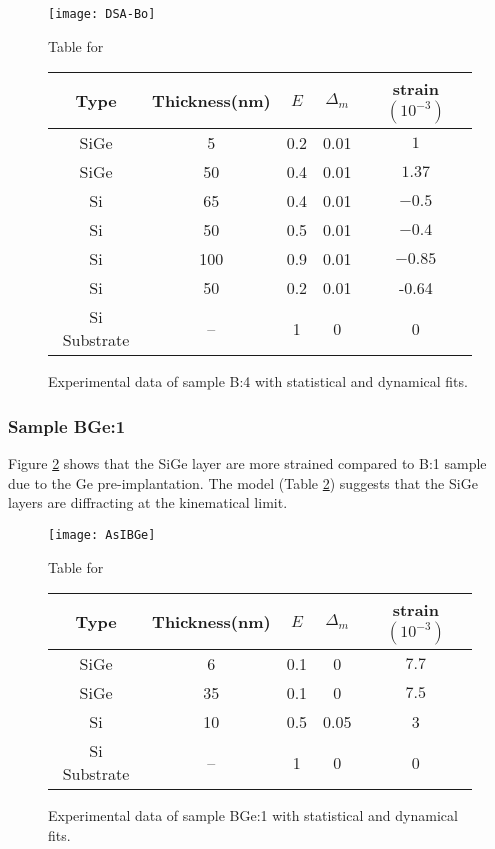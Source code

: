 \begin{figure}[ht]
\caption{Experimental data of sample B:4 with statistical and dynamical fits.}
\label{B4:fig}
\begin{minipage}{\linewidth}
\texttt{[image: DSA-Bo]}
\end{minipage}
\begin{minipage}{\linewidth}
\vspace{10pt}
\centering
Table for \\
\begin{tabular}[htbp]{@{}c|cccc@{}}
    \hline
  Type & Thickness(nm) & $E$ & $\Delta_m$ & strain $(10^{-3})$ \\
    \hline
  SiGe & 5 & 0.2 & 0.01 & $1 $  \\
  SiGe & 50 & 0.4 & 0.01 & $1.37 $  \\
  Si   & 65 & 0.4 & 0.01 & $-0.5$ \\
  Si 	 & 50 & 0.5 & 0.01 & $-0.4$\\
  Si & 100  & 0.9 & 0.01 & $-0.85$\\
  Si & 50 & 0.2 & 0.01 & -0.64\\
  Si Substrate & -- & 1 & 0 & 0
  \end{tabular}
\end{minipage}
\end{figure}

\subsubsection{Sample BGe:1}

Figure \ref{BGe1:fig} shows that the SiGe layer are more strained compared to B:1 sample due to the Ge pre-implantation.  The model (Table \ref{BGe1:fig}) suggests that the SiGe layers are diffracting at the kinematical limit.

\begin{figure}[ht]%
\caption{Experimental data of sample BGe:1 with statistical and dynamical fits.}
\label{BGe1:fig}
\begin{minipage}{\linewidth}
\texttt{[image: AsIBGe]}
\end{minipage}
\begin{minipage}{\linewidth}
\centering
\vspace{10pt}
Table for \\
\begin{tabular}[htbp]{@{}c|cccc@{}}
    \hline
  Type & Thickness(nm) & $E$ & $\Delta_m$ & strain $(10^{-3})$ \\
    \hline
  SiGe & 6 & 0.1 & 0 & $7.7 $  \\
  SiGe & 35 & 0.1 & 0 & $7.5 $  \\
  Si & 10 & 0.5 & 0.05 & 3\\
    Si Substrate & -- & 1 & 0 & 0
  \end{tabular}
\end{minipage}
\end{figure}

